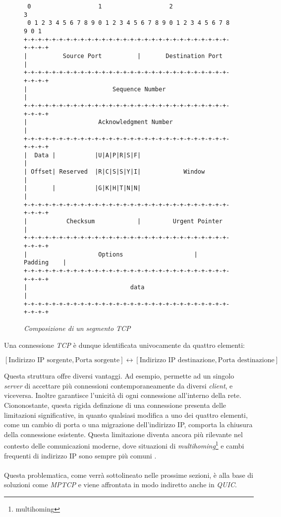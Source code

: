 \begin{figure}[!h]
\centering
\begin{BVerbatim}
 0                   1                   2                   3   
 0 1 2 3 4 5 6 7 8 9 0 1 2 3 4 5 6 7 8 9 0 1 2 3 4 5 6 7 8 9 0 1 
+-+-+-+-+-+-+-+-+-+-+-+-+-+-+-+-+-+-+-+-+-+-+-+-+-+-+-+-+-+-+-+-+
|          Source Port          |       Destination Port        |
+-+-+-+-+-+-+-+-+-+-+-+-+-+-+-+-+-+-+-+-+-+-+-+-+-+-+-+-+-+-+-+-+
|                        Sequence Number                        |
+-+-+-+-+-+-+-+-+-+-+-+-+-+-+-+-+-+-+-+-+-+-+-+-+-+-+-+-+-+-+-+-+
|                    Acknowledgment Number                      |
+-+-+-+-+-+-+-+-+-+-+-+-+-+-+-+-+-+-+-+-+-+-+-+-+-+-+-+-+-+-+-+-+
|  Data |           |U|A|P|R|S|F|                               |
| Offset| Reserved  |R|C|S|S|Y|I|            Window             |
|       |           |G|K|H|T|N|N|                               |
+-+-+-+-+-+-+-+-+-+-+-+-+-+-+-+-+-+-+-+-+-+-+-+-+-+-+-+-+-+-+-+-+
|           Checksum            |         Urgent Pointer        |
+-+-+-+-+-+-+-+-+-+-+-+-+-+-+-+-+-+-+-+-+-+-+-+-+-+-+-+-+-+-+-+-+
|                    Options                    |    Padding    |
+-+-+-+-+-+-+-+-+-+-+-+-+-+-+-+-+-+-+-+-+-+-+-+-+-+-+-+-+-+-+-+-+
|                             data                              |
+-+-+-+-+-+-+-+-+-+-+-+-+-+-+-+-+-+-+-+-+-+-+-+-+-+-+-+-+-+-+-+-+
           \end{BVerbatim}
\caption{\textit{Composizione di un segmento TCP}}
\label{fig}
\end{figure}

\noindent Una connessione \emph{TCP} è dunque identificata univocamente da quattro elementi:

\begin{center}
    \small
    $[\text{Indirizzo IP sorgente}, \text{Porta sorgente}] \leftrightarrow [\text{Indirizzo IP destinazione}, \text{Porta destinazione}]$
\end{center}

\noindent Questa struttura offre diversi vantaggi. Ad esempio, permette ad un singolo \emph{server} di accettare più connessioni contemporaneamente da diversi \emph{client}, e viceversa. 
Inoltre garantisce l'unicità di ogni connessione all'interno della rete.
\\
Ciononostante, questa rigida definzione di una connessione presenta delle limitazioni significative, in quanto qualsiasi modifica a uno dei quattro elementi, come un cambio di porta o una migrazione dell'indirizzo IP, comporta la chiusura della connessione esistente.
Questa limitazione diventa ancora più rilevante nel contesto delle comunicazioni moderne, dove situazioni di \emph{multihoming}\footnote{\gls{multihoming}} e cambi frequenti di indirizzo IP sono sempre più comuni \cite{site:tcp}. 
\\
\\
Questa problematica, come verrà sottolineato nelle prossime sezioni, è alla base di soluzioni come \emph{MPTCP} e viene affrontata in modo indiretto anche in \emph{QUIC}.

